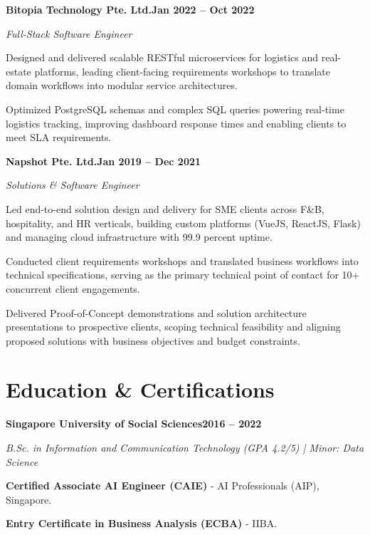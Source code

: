 \documentclass[letterpaper,10pt]{article}
\newcommand{\headingBf}[2]{\par\noindent\hspace*{10pt}\textbf{#1}\hfill\textbf{#2}}
\newcommand{\headingIt}[2]{\par\noindent\hspace*{10pt}\textit{#1}\hfill\textit{#2}}
\newenvironment{resume_list}{\vspace{-7pt}\begin{itemize}[itemsep=-2px, parsep=1pt, leftmargin=30pt]}{\end{itemize}}
\begin{document}
  \headingBf{Bitopia Technology Pte. Ltd.}{Jan 2022 -- Oct 2022}
  \headingIt{Full-Stack Software Engineer}{}
  \begin{resume_list}
    \item Designed and delivered scalable RESTful microservices for logistics and real-estate platforms, leading client-facing requirements workshops to translate domain workflows into modular service architectures.
    \item Optimized PostgreSQL schemas and complex SQL queries powering real-time logistics tracking, improving dashboard response times and enabling clients to meet SLA requirements.
  \end{resume_list}

  \headingBf{Napshot Pte. Ltd.}{Jan 2019 -- Dec 2021}
  \headingIt{Solutions \& Software Engineer}{}
  \begin{resume_list}
    \item Led end-to-end solution design and delivery for SME clients across F\&B, hospitality, and HR verticals, building custom platforms (VueJS, ReactJS, Flask) and managing cloud infrastructure with 99.9 percent uptime.
    \item Conducted client requirements workshops and translated business workflows into technical specifications, serving as the primary technical point of contact for 10+ concurrent client engagements.
    \item Delivered Proof-of-Concept demonstrations and solution architecture presentations to prospective clients, scoping technical feasibility and aligning proposed solutions with business objectives and budget constraints.
  \end{resume_list}

  \section{Education \& Certifications}
  \headingBf{Singapore University of Social Sciences}{2016 -- 2022}
  \headingIt{B.Sc. in Information and Communication Technology (GPA 4.2/5) | Minor: Data Science}{}
  \begin{resume_list}
    \item \textbf{Certified Associate AI Engineer (CAIE)} - AI Professionals (AIP), Singapore.
    \item \textbf{Entry Certificate in Business Analysis (ECBA)} - IIBA.
  \end{resume_list}
\end{document}
